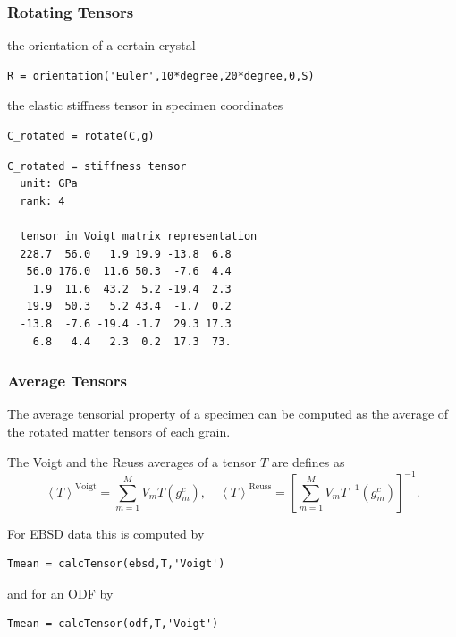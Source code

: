 \begin{frame}[fragile]
  \frametitle{Rotating Tensors}

  the orientation of a certain crystal
  \begin{lstlisting}
R = orientation('Euler',10*degree,20*degree,0,S)
  \end{lstlisting}

\medskip
\pause

the elastic stiffness tensor in specimen coordinates
\begin{lstlisting}
C_rotated = rotate(C,g)
\end{lstlisting}
\begin{lstlisting}[style=output]
C_rotated = stiffness tensor
  unit: GPa
  rank: 4

  tensor in Voigt matrix representation
  228.7  56.0   1.9 19.9 -13.8  6.8
   56.0 176.0  11.6 50.3  -7.6  4.4
    1.9  11.6  43.2  5.2 -19.4  2.3
   19.9  50.3   5.2 43.4  -1.7  0.2
  -13.8  -7.6 -19.4 -1.7  29.3 17.3
    6.8   4.4   2.3  0.2  17.3  73.
\end{lstlisting}



\end{frame}





\begin{frame}
  \frametitle{Average Tensors}

The average tensorial property of a specimen can be computed as the average of
the rotated matter tensors of each grain.

\medskip
\pause

The Voigt and the Reuss averages of a tensor $T$ are defines as
\begin{equation*}
  \left<T\right>^{\text{Voigt}}
  = \sum_{m=1}^{M} V_{m} T(g_{m}^{c}), \quad
  \left<T\right>^{\text{Reuss}}
  = \left[ \sum_{m=1}^{M} V_{m} T^{-1}(g_{m}^{c}) \right]^{-1}.
\end{equation*}

\medskip
\pause

For EBSD data this is computed by
\begin{lstlisting}
Tmean = calcTensor(ebsd,T,'Voigt')
\end{lstlisting}

\medskip
\pause

and for an ODF by
\begin{lstlisting}
Tmean = calcTensor(odf,T,'Voigt')
\end{lstlisting}



\end{frame}

